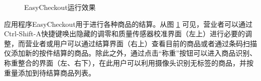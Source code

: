 \begin{figure}[htbp]
    \centering
    \hfill
    \vspace{1em}
    \hfill
	\caption{EasyCheckout运行效果}
	\label{fig:ec}
\end{figure}

应用程序EasyCheckout用于进行各种商品的结算。从图 \ref{fig:ec} 可见，营业者可以通过Ctrl-Shift-A快捷键唤出隐藏的调零和质量传感器校准界面（左上）进行必要的调整，而营业者或用户可以通过结算界面（右上）查看目前的商品或者通过条码扫描仪添加新的按件结算的商品。除此之外，通过点击“称重”按钮可以进入商品识别、称重整合的界面（左、右下），在此用户可以利用摄像头识别无标签的商品，并按重量添加到待结算商品列表。